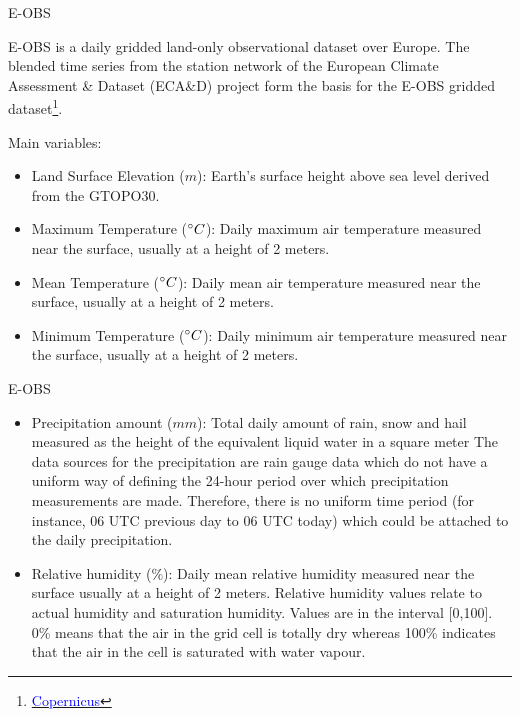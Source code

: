 \documentclass[xcolor={dvipsnames}]{beamer}
\begin{document}
\begin{frame}{E-OBS}

E-OBS is a daily gridded land-only observational dataset over Europe. The blended time series from the station network of the European Climate Assessment & Dataset (ECA&D) project form the basis for the E-OBS gridded dataset\footnote{\href{https://cds.climate.copernicus.eu/cdsapp#!/dataset/insitu-gridded-observations-europe?tab=overview}{\textcolor{blue}{Copernicus}}}.

\pause

\hfill

Main variables:
\begin{itemize}
    \item Land Surface Elevation ($m$): Earth's surface height above sea level derived from the GTOPO30.
    \item Maximum Temperature ($\degree C$): Daily maximum air temperature measured near the surface, usually at a height of 2 meters.
    \item Mean Temperature ($\degree C$): Daily mean air temperature measured near the surface, usually at a height of 2 meters.
    \item Minimum Temperature ($\degree C$): Daily minimum air temperature measured near the surface, usually at a height of 2 meters.
\end{itemize}

\end{frame}

\begin{frame}{E-OBS}

\begin{itemize}
    \item Precipitation amount ($mm$): Total daily amount of rain, snow and hail measured as the height of the equivalent liquid water in a square meter The data sources for the precipitation are rain gauge data which do not have a uniform way of defining the 24-hour period over which precipitation measurements are made. Therefore, there is no uniform time period (for instance, 06 UTC previous day to 06 UTC today) which could be attached to the daily precipitation.
    \item Relative humidity ($\%$): Daily mean relative humidity measured near the surface usually at a height of 2 meters. Relative humidity values relate to actual humidity and saturation humidity. Values are in the interval [0,100]. 0\% means that the air in the grid cell is totally dry whereas 100\% indicates that the air in the cell is saturated with water vapour.
\end{itemize}
    
\end{frame}
\end{document}

